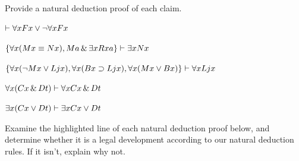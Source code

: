 \solutions
\problempart
\label{pr.someQLproofs}
Provide a natural deduction proof of each claim.
\begin{earg}
\item $\vdash \forall x Fx \vee \neg \forall x Fx$
\item $\{\forall x(Mx \equiv Nx), Ma\,\&\,\exists x Rxa\}\vdash \exists x Nx$
\item $\{\forall x(\neg Mx \vee Ljx), \forall x(Bx\supset Ljx), \forall x(Mx\vee Bx)\}\vdash \forall xLjx$
\item $\forall x(Cx \,\&\, Dt)\vdash \forall xCx \,\&\, Dt$
\item $\exists x(Cx \vee Dt)\vdash \exists x Cx \vee Dt$
\end{earg}

\problempart
Examine the highlighted line of each natural deduction proof below, and determine whether it is a legal development according to our natural deduction rules. If it isn't, explain why not.

